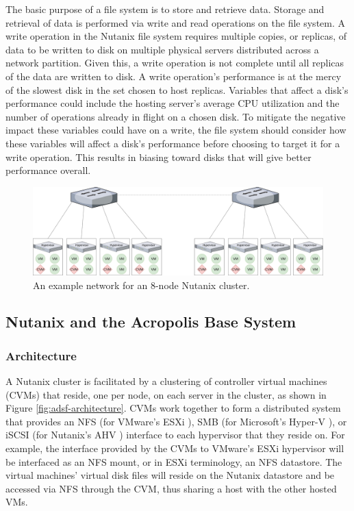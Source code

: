\documentclass[12pt]{article}
\begin{document}
  The basic purpose of a file system is to store and retrieve data. Storage and
  retrieval of data is performed via write and read operations on the file
  system. A write operation in the Nutanix file system requires multiple
  copies, or replicas, of data to be written to disk on multiple physical
  servers distributed across a network partition. Given this, a write operation
  is not complete until all replicas of the data are written to disk. A write
  operation's performance is at the mercy of the slowest disk in the set chosen
  to host replicas. Variables that affect a disk's performance could include
  the hosting server's average CPU utilization and the number of operations
  already in flight on a chosen disk.  To mitigate the negative impact these
  variables could have on a write, the file system should consider how
  these variables will affect a disk's performance before choosing to target it
  for a write operation. This results in biasing toward disks that will give
  better performance overall.

  \begin{figure}[htbp]
    \centering
    \includegraphics[scale=0.19]{images/network_diagram.png} 
    \caption{An example network for an 8-node Nutanix cluster.}
    \label{fig:adsf-network}
  \end{figure}

  \subsection{Nutanix and the Acropolis Base System} \label{sssec:abs}

    \subsubsection{Architecture}

    A Nutanix cluster is facilitated by a clustering of controller virtual
    machines (CVMs) that reside, one per node, on each server in the cluster,
    as shown in Figure \ref{fig:adsf-architecture}. CVMs work together to form
    a distributed system that provides an NFS (for VMware's ESXi
    \cite{esxi2008}), SMB (for Microsoft's Hyper-V \cite{hyperv2009}), or iSCSI
    (for Nutanix's AHV \cite{bible}) interface to each hypervisor that they
    reside on. For example, the interface provided by the CVMs to VMware's ESXi
    hypervisor will be interfaced as an NFS mount, or in ESXi terminology,
    an NFS datastore. The virtual machines' virtual disk files will reside on the
    Nutanix datastore and be accessed via NFS through the CVM, thus sharing a host
    with the other hosted VMs.
\end{document}
